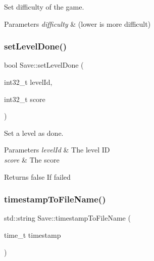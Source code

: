 Set difficulty of the game. 


\begin{DoxyParams}{Parameters}
{\em difficulty} & (lower is more difficult) \\
\hline
\end{DoxyParams}
\mbox{\label{class_save_a6423aab69350aaafaad752830e191840}} 
\subsubsection{\texorpdfstring{set\+Level\+Done()}{setLevelDone()}}
{\footnotesize\ttfamily bool Save\+::set\+Level\+Done (\begin{DoxyParamCaption}\item[{int32\+\_\+t}]{level\+Id,  }\item[{int32\+\_\+t}]{score }\end{DoxyParamCaption})\hspace{0.3cm}{\ttfamily [static]}}



Set a level as done. 


\begin{DoxyParams}{Parameters}
{\em level\+Id} & The level ID \\
\hline
{\em score} & The score \\
\hline
\end{DoxyParams}
\begin{DoxyReturn}{Returns}
false If failed 
\end{DoxyReturn}
\mbox{\label{class_save_af787535a55af6b09cd0834a979661120}} 
\subsubsection{\texorpdfstring{timestamp\+To\+File\+Name()}{timestampToFileName()}}
{\footnotesize\ttfamily std\+::string Save\+::timestamp\+To\+File\+Name (\begin{DoxyParamCaption}\item[{time\+\_\+t}]{timestamp }\end{DoxyParamCaption})\hspace{0.3cm}{\ttfamily [static]}}



